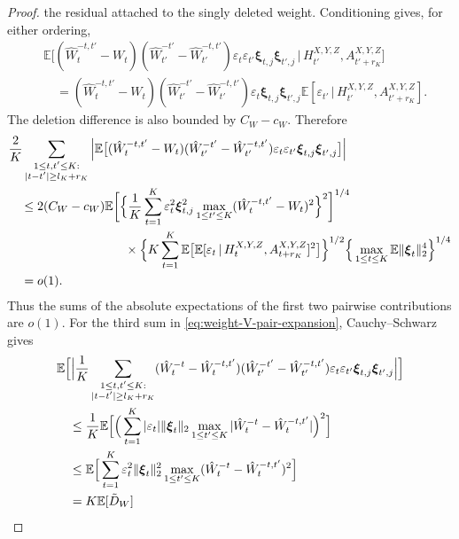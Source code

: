 \documentclass[12pt]{article}
\def\E{\mathbb{E}}
\newcommand\given{\,|\,}
\numberwithin{equation}{section}
\begin{document}
\begin{proof}
the residual attached to the singly deleted weight. Conditioning gives,
for either ordering,
\begin{align*}
&\E\big[
(\hat W_t^{-t,t'}-W_t)
(\hat W_{t'}^{-t'}-\hat W_{t'}^{-t,t'})
\varepsilon_t\varepsilon_{t'}
\boldsymbol\xi_{t,j}\boldsymbol\xi_{t',j}
\given H_{t'}^{X,Y,Z},A_{t'+r_K}^{X,Y,Z}
\big]\\
&\quad=
(\hat W_t^{-t,t'}-W_t)
(\hat W_{t'}^{-t'}-\hat W_{t'}^{-t,t'})
\varepsilon_t\boldsymbol\xi_{t,j}\boldsymbol\xi_{t',j}
\E[\varepsilon_{t'}\given
H_{t'}^{X,Y,Z},A_{t'+r_K}^{X,Y,Z}].
\end{align*}
The deletion difference is also bounded by \(C_W-c_W\). Therefore
\begin{align}
&\frac2K\sum_{\substack{1\leq t,t'\leq K:\\
|t-t'|\geq l_K+r_K}}
\Big|\E\big[
(\hat W_t^{-t,t'}-W_t)
(\hat W_{t'}^{-t'}-\hat W_{t'}^{-t,t'})
\varepsilon_t\varepsilon_{t'}
\boldsymbol\xi_{t,j}\boldsymbol\xi_{t',j}
\big]\Big|\notag\\
&\quad\leq2(C_W-c_W)
\E\bigg[\Big\{\frac1K\sum_{t=1}^K
\varepsilon_t^2\boldsymbol\xi_{t,j}^2
\max_{1\leq t'\leq K}
(\hat W_t^{-t,t'}-W_t)^2\Big\}^{2}\bigg]^{1/4}
\notag\\*
&\hspace{33mm}{}\times
\Big\{K\sum_{t=1}^K
\E\big[\E[\varepsilon_t\given
H_t^{X,Y,Z},A_{t+r_K}^{X,Y,Z}]^2\big]\Big\}^{1/2}
\Big\{\max_{1\leq t\leq K}
\E\|\boldsymbol\xi_t\|_2^4\Big\}^{1/4}\notag\\
&\quad=o(1).
\label{eq:weight-V-mixed-bound}
\end{align}
Thus the sums of the absolute expectations of the first two
pairwise contributions are \(o(1)\).
For the third sum in \eqref{eq:weight-V-pair-expansion},
Cauchy--Schwarz gives
\begin{align}
&\E\Big[
\Big|\frac1K\sum_{\substack{1\leq t,t'\leq K:\\
|t-t'|\geq l_K+r_K}}
(\hat W_t^{-t}-\hat W_t^{-t,t'})
(\hat W_{t'}^{-t'}-\hat W_{t'}^{-t,t'})
\varepsilon_t\varepsilon_{t'}
\boldsymbol\xi_{t,j}\boldsymbol\xi_{t',j}
\Big|
\Big]\notag\\
&\quad\leq\frac1K
\E\Big[
\Big(\sum_{t=1}^K
|\varepsilon_t|\|\boldsymbol\xi_t\|_2
\max_{1\leq t'\leq K}
|\hat W_t^{-t}-\hat W_t^{-t,t'}|\Big)^2
\Big]\notag\\
&\quad\leq
\E\Big[
\sum_{t=1}^K\varepsilon_t^2\|\boldsymbol\xi_t\|_2^2
\max_{1\leq t'\leq K}
(\hat W_t^{-t}-\hat W_t^{-t,t'})^2
\Big]\notag\\
&\quad=K\E[\tilde D_W]\notag\\

\end{align}
\end{proof}
\end{document}
